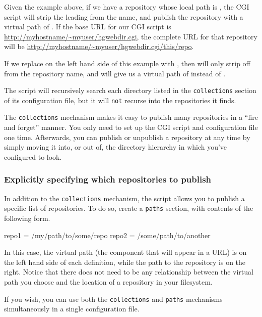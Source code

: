 Given the example above, if we have a repository whose local path is
, the CGI script will strip the leading
 from the name, and publish the repository with a
virtual path of .  If the base URL for our CGI
script is \url{http://myhostname/~myuser/hgwebdir.cgi}, the complete
URL for that repository will be
\url{http://myhostname/~myuser/hgwebdir.cgi/this/repo}.

If we replace  on the left hand side of this example
with , then  will only strip off
 from the repository name, and will give us a virtual
path of  instead of .

The  script will recursively search each
directory listed in the \texttt{collections} section of its
configuration file, but it will \texttt{not} recurse into the
repositories it finds.

The \texttt{collections} mechanism makes it easy to publish many
repositories in a ``fire and forget'' manner.  You only need to set up
the CGI script and configuration file one time.  Afterwards, you can
publish or unpublish a repository at any time by simply moving it
into, or out of, the directory hierarchy in which you've configured
 to look.

\subsubsection{Explicitly specifying which repositories to publish}

In addition to the \texttt{collections} mechanism, the
 script allows you to publish a specific list
of repositories.  To do so, create a \texttt{paths} section, with
contents of the following form.
\begin{codesample2}
  [paths]
  repo1 = /my/path/to/some/repo
  repo2 = /some/path/to/another
\end{codesample2}
In this case, the virtual path (the component that will appear in a
URL) is on the left hand side of each definition, while the path to
the repository is on the right.  Notice that there does not need to be
any relationship between the virtual path you choose and the location
of a repository in your filesystem.

If you wish, you can use both the \texttt{collections} and
\texttt{paths} mechanisms simultaneously in a single configuration
file.

